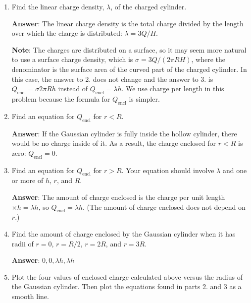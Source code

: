 \documentclass{article}
\begin{document}


\begin{enumerate}

  \item Find the linear charge density, $\lambda$, of the charged cylinder.

        \ifsolutions
          \textbf{Answer}: The linear charge density is the total charge divided by the length over which the charge is distributed: $\lambda={3Q}/{H}$.
        
          \textbf{Note}: The charges are distributed on a surface, so it may seem more natural to use a surface charge density, which is $\sigma = 3Q/(2\pi R H)$, where the denominator is the surface area of the curved part of the charged cylinder. In this case, the answer to 2. does not change and the answer to 3. is $Q_{\text{encl}} = \sigma 2\pi R h$ instead of $Q_{\text{encl}}=\lambda h$. We use charge per length in this problem because the formula for $Q_{\text{encl}}$ is simpler.
        \else
          \vskip 36.135pt
        \fi

  \item Find an equation for $Q_{\text{encl}}$ for $r<R$.

        \ifsolutions
          \textbf{Answer}: If the Gaussian cylinder is fully inside the hollow cylinder, there would be no charge inside of it. As a result, the charge enclosed for $r< R$ is zero: $Q_{\text{encl}}=0$.
        \else
          \vskip 36.135pt
        \fi

  \item Find an equation for $Q_{\text{encl}}$ for $r>R$. Your equation should involve $\lambda$ and one or more of $h$, $r$, and $R$.

        \textbf{Answer}: The amount of charge enclosed is the charge per unit length $\times h = \lambda h$, so  $Q_{\text{encl}}=\lambda h$. (The amount of charge enclosed does not depend on $r$.)

        \ifsolutions\else
        \vskip 36.135pt
        \fi

  \item Find the amount of charge enclosed by the Gaussian cylinder when it has radii of $r=0$, $r=R/2$, $r=2R$, and $r=3R$.

        \ifsolutions
          \textbf{Answer}: $0, 0, \lambda h, \lambda h$
        \else
          \vskip 36.135pt
        \fi

  \item Plot the four values of enclosed charge calculated above versus the radius of the Gaussian cylinder. Then plot the equations found in parts 2. and 3 as a smooth line.

        \ifsolutions
          
        \fi

\end{enumerate}
\end{document}
